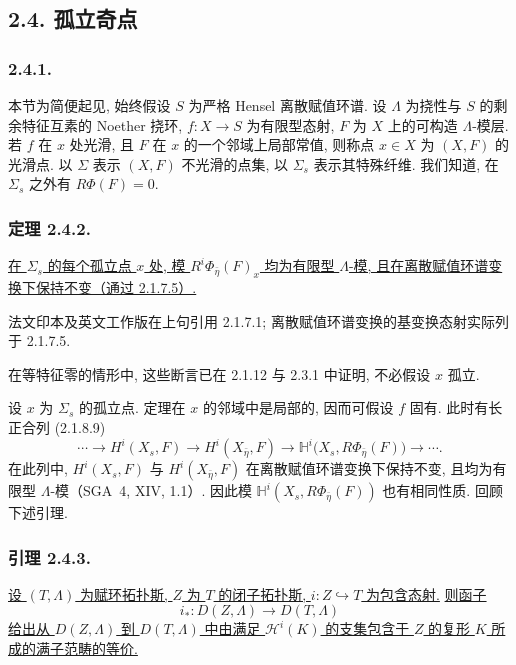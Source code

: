 \subsection*{2.4. 孤立奇点}

\subsubsection*{2.4.1.}
本节为简便起见, 始终假设 $S$ 为严格 Hensel 离散赋值环谱. 设 $\Lambda$ 为挠性与 $S$ 的剩余特征互素的 Noether 挠环, $f:X\longrightarrow S$ 为有限型态射, $F$ 为 $X$ 上的可构造 $\Lambda$-模层. 若 $f$ 在 $x$ 处光滑, 且 $F$ 在 $x$ 的一个邻域上局部常值, 则称点 $x\in X$ 为 $(X,F)$ 的光滑点. 以 $\Sigma$ 表示 $(X,F)$ 不光滑的点集, 以 $\Sigma_s$ 表示其特殊纤维. 我们知道, 在 $\Sigma_s$ 之外有 $R\Phi(F)=0$.

\subsubsection*{定理 2.4.2.}
\underline{在 $\Sigma_s$ 的每个孤立点 $x$ 处, 模 $R^i\Phi_{\bar\eta}(F)_x$ 均为有限型 $\Lambda$-模, 且在离散赋值环谱变换下保持不变（通过 2.1.7.5）.}

\begin{editorialnote}法文印本及英文工作版在上句引用 2.1.7.1; 离散赋值环谱变换的基变换态射实际列于 2.1.7.5.\end{editorialnote}

在等特征零的情形中, 这些断言已在 2.1.12 与 2.3.1 中证明, 不必假设 $x$ 孤立.

设 $x$ 为 $\Sigma_s$ 的孤立点. 定理在 $x$ 的邻域中是局部的, 因而可假设 $f$ 固有. 此时有长正合列 (2.1.8.9)
\[
\cdots\longrightarrow H^i(X_s,F)
\longrightarrow H^i(X_{\bar\eta},F)
\longrightarrow
\mathbb H^i\bigl(X_s,R\Phi_{\bar\eta}(F)\bigr)
\longrightarrow\cdots .
\]
在此列中, $H^i(X_s,F)$ 与 $H^i(X_{\bar\eta},F)$ 在离散赋值环谱变换下保持不变, 且均为有限型 $\Lambda$-模（SGA~4, XIV, 1.1）. 因此模 $\mathbb H^i(X_s,R\Phi_{\bar\eta}(F))$ 也有相同性质. 回顾下述引理.

\subsubsection*{引理 2.4.3.}
\underline{设 $(T,\Lambda)$ 为赋环拓扑斯, $Z$ 为 $T$ 的闭子拓扑斯, $i:Z\hookrightarrow T$ 为包含态射.} \underline{则函子}
\[
i_*:D(Z,\Lambda)\longrightarrow D(T,\Lambda)
\]
\underline{给出从 $D(Z,\Lambda)$ 到 $D(T,\Lambda)$ 中由满足 $\mathcal H^i(K)$ 的支集包含于 $Z$ 的复形 $K$ 所成的满子范畴的等价.}

